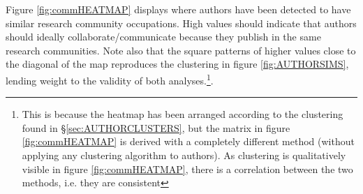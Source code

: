 Figure \ref{fig:commHEATMAP} displays where authors have been detected to have similar research community occupations. High values should indicate that authors should ideally collaborate/communicate because they publish in the same research communities. Note also that the square patterns of higher values close to the diagonal of the map reproduces the clustering in figure \ref{fig:AUTHORSIMS}, lending weight to the validity of both analyses.\footnote{This is because the heatmap has been arranged according to the clustering found in \S\ref{sec:AUTHORCLUSTERS}, but the matrix in figure \ref{fig:commHEATMAP} is derived with a completely different method (without applying any clustering algorithm to authors). As clustering is qualitatively visible in figure \ref{fig:commHEATMAP}, there is a correlation between the two methods, i.e. they are consistent}.


